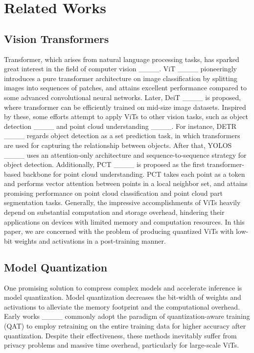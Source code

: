 \section{Related Works}
\subsection{Vision Transformers}
Transformer, which arises from natural language processing tasks, has sparked great interest in the field of computer vision ____. ViT ____ pioneeringly introduces a pure transformer architecture on image classification by splitting images into sequences of patches, and attains excellent performance compared to some advanced convolutional neural networks. Later, DeiT ____ is proposed, where transformer can be efficiently trained on mid-size image datasets. Inspired by these, some efforts attempt to apply ViTs to other vision tasks, such as object detection ____ and point cloud understanding ____. For instance, DETR ____ regards object detection as a set prediction task, in which transformers are used for capturing the relationship between objects. After that, YOLOS ____ uses an attention-only architecture and sequence-to-sequence strategy for object detection. Additionally, PCT ____ is proposed as the first transformer-based backbone for point cloud understanding. PCT takes each point as a token and performs vector attention between points in a local neighbor set, and attains promising performance on point cloud classification and point cloud part segmentation tasks. Generally, the impressive accomplishments of ViTs heavily depend on substantial computation and storage overhead, hindering their applications on devices with limited memory and computation resources. In this paper, we are concerned with the problem of producing quantized ViTs with low-bit weights and activations in a post-training manner. 

\subsection{Model Quantization}
One promising solution to compress complex models and accelerate inference is model quantization. Model quantization decreases the bit-width of weights and activations to alleviate the memory footprint and the computational overhead. Early works ____ commonly adopt the paradigm of quantization-aware training (QAT) to employ retraining on the entire training data for higher accuracy after quantization. Despite their effectiveness, these methods inevitably suffer from privacy problems and massive time overhead, particularly for large-scale ViTs. 

